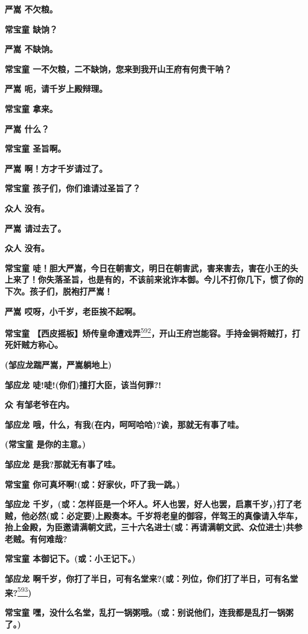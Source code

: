 \textbf{严嵩 不欠粮。}

\textbf{常宝童 缺饷？}

\textbf{严嵩 不缺饷。}

\textbf{常宝童 一不欠粮，二不缺饷，您来到我开山王府有何贵干呐？}

\textbf{严嵩 呃，请千岁上殿辩理。}

\textbf{常宝童 拿来。}

\textbf{严嵩 什么？}

\textbf{常宝童 圣旨啊。}

\textbf{严嵩 啊！方才千岁请过了。}

\textbf{常宝童 孩子们，你们谁请过圣旨了？}

\textbf{众人 没有。}

\textbf{严嵩 请过去了。}

\textbf{众人 没有。}

\textbf{常宝童
唗！胆大严嵩，今日在朝害文，明日在朝害武，害来害去，害在小王的头上来了！你失落圣旨，也是有的，不该前来讹诈本御。今儿不打你几下，惯了你的下次。孩子们，脱袍打严嵩！}

\textbf{严嵩 哎呀，小千岁，老臣挨不起啊。}

\textbf{常宝童
【西皮摇板】矫传皇命遭戏弄}\protect\hyperlink{fn592}{\textsuperscript{592}}\textbf{，开山王府岂能容。手持金锏将贼打，打死奸贼方称心。}

\textbf{(邹应龙踹严嵩，严嵩躺地上)}

\textbf{邹应龙 唗!唗!(你们)擅打大臣，该当何罪?!}

\textbf{众 有邹老爷在内。}

\textbf{邹应龙 哦，什么，有我(在内，呵呵哈哈)?诶，那就无有事了哇。}

\textbf{(常宝童 是你的主意。)}

\textbf{邹应龙 是我?那就无有事了哇。}

\textbf{常宝童 你可真坏啊!(或：好家伙，吓了我一跳。)}

\textbf{邹应龙
千岁，(或：怎样臣是一个坏人。坏人也罢，好人也罢，启禀千岁，)打了老贼，他必然(或：必定要)上殿奏本。千岁将老皇的御容，伴驾王的真像请入华车，抬上金殿，为臣邀请满朝文武，三十六名进士(或：再请满朝文武、众位进士)共参老贼。有何难哉?}

\textbf{常宝童 本御记下。(或：小王记下。)}

\textbf{邹应龙
啊千岁，你打了半日，可有名堂来?(或：列位，你们打了半日，可有名堂来?}\protect\hyperlink{fn593}{\textsuperscript{593}}\textbf{)}

\textbf{常宝童
嘿，没什么名堂，乱打一锅粥哦。(或：别说他们，连我都是乱打一锅粥了。)}

